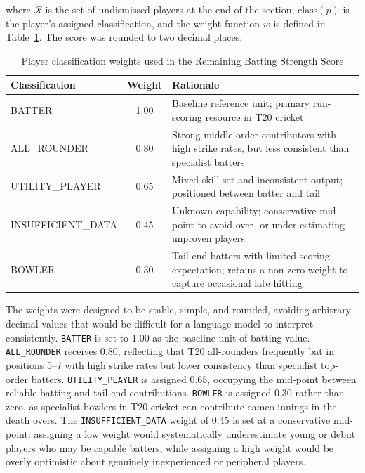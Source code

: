 where $\mathcal{R}$ is the set of undismissed players at the end of the section, $\text{class}(p)$ is the player's assigned classification, and the weight function $w$ is defined in Table~\ref{tab:rbss_weights}. The score was rounded to two decimal places.

\begin{table}[ht]
\centering
\caption{Player classification weights used in the Remaining Batting Strength Score}
\label{tab:rbss_weights}
\begin{tabular}{lcp{8cm}}
\hline
\textbf{Classification} & \textbf{Weight} & \textbf{Rationale} \\
\hline
BATTER             & 1.00 & Baseline reference unit; primary run-scoring resource in T20 cricket \\
ALL\_ROUNDER       & 0.80 & Strong middle-order contributors with high strike rates, but less consistent than specialist batters \\
UTILITY\_PLAYER   & 0.65 & Mixed skill set and inconsistent output; positioned between batter and tail \\
INSUFFICIENT\_DATA & 0.45 & Unknown capability; conservative mid-point to avoid over- or under-estimating unproven players \\
BOWLER             & 0.30 & Tail-end batters with limited scoring expectation; retains a non-zero weight to capture occasional late hitting \\
\hline
\end{tabular}
\end{table}

The weights were designed to be stable, simple, and rounded, avoiding arbitrary decimal values that would be difficult for a language model to interpret consistently. \texttt{BATTER} is set to 1.00 as the baseline unit of batting value. \texttt{ALL\_ROUNDER} receives 0.80, reflecting that T20 all-rounders frequently bat in positions 5--7 with high strike rates but lower consistency than specialist top-order batters. \texttt{UTILITY\_PLAYER} is assigned 0.65, occupying the mid-point between reliable batting and tail-end contributions. \texttt{BOWLER} is assigned 0.30 rather than zero, as specialist bowlers in T20 cricket can contribute cameo innings in the death overs. The \texttt{INSUFFICIENT\_DATA} weight of 0.45 is set at a conservative mid-point: assigning a low weight would systematically underestimate young or debut players who may be capable batters, while assigning a high weight would be overly optimistic about genuinely inexperienced or peripheral players.

